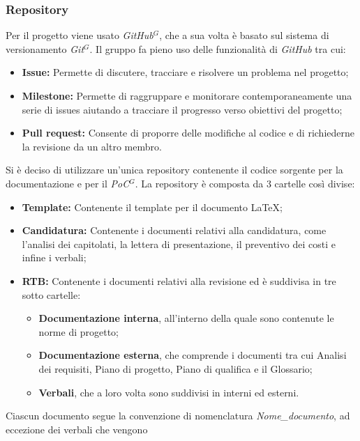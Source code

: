 \subsubsection{Repository}
    Per il progetto viene usato \emph{GitHub}$^{G}$, che a sua volta è basato sul sistema di versionamento
    \emph{Git}$^{G}$. Il gruppo fa pieno uso delle funzionalità di \emph{GitHub} tra cui:
    \begin{itemize}
        \item \textbf{Issue:} Permette di discutere, tracciare e risolvere un problema nel progetto;
        \item \textbf{Milestone:} Permette di raggruppare e monitorare contemporaneamente una serie di issues aiutando a tracciare il progresso verso obiettivi del progetto;
        \item \textbf{Pull request:} Consente di proporre delle modifiche al codice e di richiederne la revisione da un altro membro.
    \end{itemize}
    Si è deciso di utilizzare un'unica repository contenente il codice sorgente per la documentazione e per il \emph{PoC}$^{G}$.
    La repository è composta da 3 cartelle così divise:
    \begin{itemize}
        \item \textbf{Template:} Contenente il template per il documento \LaTeX;
        \item \textbf{Candidatura:} Contenente i documenti relativi alla candidatura, come l'analisi dei capitolati, la lettera di presentazione, il preventivo dei costi e infine i verbali;
        \item \textbf{RTB:} Contenente i documenti relativi alla revisione ed è suddivisa in tre sotto cartelle:
        \begin{itemize}
            \item \textbf{Documentazione interna}, all'interno della quale sono contenute le norme di progetto;
            \item \textbf{Documentazione esterna}, che comprende i documenti tra cui Analisi dei requisiti, Piano di progetto, Piano di qualifica e il Glossario;
            \item \textbf{Verbali}, che a loro volta sono suddivisi in interni ed esterni.
        \end{itemize}
    \end{itemize}
    Ciascun documento segue la convenzione di nomenclatura \emph{Nome\_documento}, ad eccezione dei verbali che vengono
